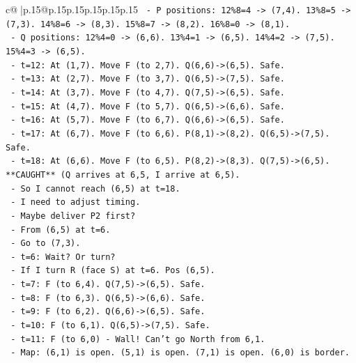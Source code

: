 \documentclass{article}
\begin{document}
{\begin{supertabular}{c@{$\;$}|p{.15\linewidth}@{}p{.15\linewidth}p{.15\linewidth}p{.15\linewidth}p{.15\linewidth}p{.15\linewidth}}
{{{\texttt{            {-} P positions: 12\%8=4 {-}> (7,4). 13\%8=5 {-}> (7,3). 14\%8=6 {-}> (8,3). 15\%8=7 {-}> (8,2). 16\%8=0 {-}> (8,1).} \\
\texttt{            {-} Q positions: 12\%4=0 {-}> (6,6). 13\%4=1 {-}> (6,5). 14\%4=2 {-}> (7,5). 15\%4=3 {-}> (6,5).} \\
\texttt{            {-} t=12: At (1,7). Move F (to 2,7). Q(6,6){-}>(6,5). Safe.} \\
\texttt{            {-} t=13: At (2,7). Move F (to 3,7). Q(6,5){-}>(7,5). Safe.} \\
\texttt{            {-} t=14: At (3,7). Move F (to 4,7). Q(7,5){-}>(6,5). Safe.} \\
\texttt{            {-} t=15: At (4,7). Move F (to 5,7). Q(6,5){-}>(6,6). Safe.} \\
\texttt{            {-} t=16: At (5,7). Move F (to 6,7). Q(6,6){-}>(6,5). Safe.} \\
\texttt{            {-} t=17: At (6,7). Move F (to 6,6). P(8,1){-}>(8,2). Q(6,5){-}>(7,5). Safe.} \\
\texttt{            {-} t=18: At (6,6). Move F (to 6,5). P(8,2){-}>(8,3). Q(7,5){-}>(6,5). **CAUGHT** (Q arrives at 6,5, I arrive at 6,5).} \\
\texttt{            {-} So I cannot reach (6,5) at t=18.} \\
\texttt{            {-} I need to adjust timing.} \\
\texttt{            {-} Maybe deliver P2 first?} \\
\texttt{            {-} From (6,5) at t=6.} \\
\texttt{            {-} Go to (7,3).} \\
\texttt{            {-} t=6: Wait? Or turn?} \\
\texttt{            {-} If I turn R (face S) at t=6. Pos (6,5).} \\
\texttt{            {-} t=7: F (to 6,4). Q(7,5){-}>(6,5). Safe.} \\
\texttt{            {-} t=8: F (to 6,3). Q(6,5){-}>(6,6). Safe.} \\
\texttt{            {-} t=9: F (to 6,2). Q(6,6){-}>(6,5). Safe.} \\
\texttt{            {-} t=10: F (to 6,1). Q(6,5){-}>(7,5). Safe.} \\
\texttt{            {-} t=11: F (to 6,0) {-} Wall! Can't go North from 6,1.} \\
\texttt{            {-} Map: (6,1) is open. (5,1) is open. (7,1) is open. (6,0) is border.} \\
}}}
\end{supertabular}}
\end{document}
